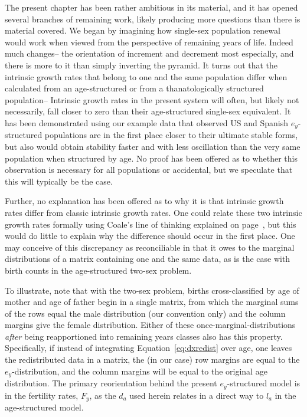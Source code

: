\FloatBarrier

The present chapter has been rather ambitious in its material, and it has opened
several branches of remaining work, likely producing more questions
than there is material covered. We began by imagining how single-sex population
renewal would work when viewed from the perspective of remaining years of life. 
Indeed much changes-- the orientation of increment and decrement most
especially, and there is more to it than simply inverting the pyramid. It turns
out that the intrinsic growth rates that belong to one and the same population 
differ when calculated from an age-structured or from a thanatologically 
structured population-- Intrinsic growth rates in the present
system will often, but likely not necessarily, fall closer to zero than their
age-structured single-sex equivalent. It has been demonstrated using our 
example data that observed US and Spanish $e_y$-structured populations
are in the first place closer to their ultimate stable forms, but also would 
obtain stability faster and with less oscillation
than the very same population when structured by age. No proof has been offered
as to whether this observation is necessary for all populations or accidental,
but we speculate that this will typically be the case. 

Further, no explanation
has been offered as to why it is that intrinsic growth rates differ from classic 
intrinsic growth rates. One could relate these two intrinsic growth
rates formally using Coale's line of thinking explained on
page~\pageref{par:coalermrf}, but this would do little to explain why the
difference should occur in the first place. One may conceive of this
discrepancy as reconciliable in that it owes to the marginal distributions
of a matrix containing one and the same data, as is the case with birth counts
in the age-structured two-sex problem. 

To illustrate, note that with the two-sex
problem, births cross-classified by age of mother and age of father begin 
in a single matrix, from which the marginal
sums of the rows equal the male distribution (our convention only) and the
column margins give the female distribution. Either of these
once-marginal-distributions \textit{after} being reapportioned into
remaining years classes also has this property. Specifically, if instead of
integrating Equation~\eqref{eq:dxredist} over age, one leaves the redistributed
data in a matrix, the (in our case) row margins are equal to the
$e_y$-distribution, and the column margins will be equal to the original age
distribution. The primary reorientation behind the present
$e_y$-structured model is in the fertility rates, $F_y$, as the $d_a$ used
herein relates in a direct way to $l_a$ in the age-structured model. 

